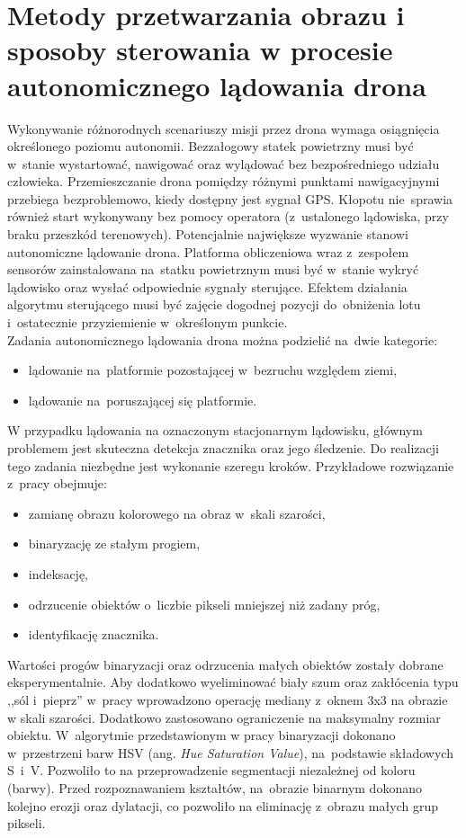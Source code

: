 \chapter{Metody przetwarzania obrazu i sposoby sterowania w procesie autonomicznego lądowania drona}
\label{cha:Metody przetwarzania obrazu i sposoby sterowania w procesie autonomicznego lądowania drona}
Wykonywanie różnorodnych scenariuszy misji przez drona wymaga osiągnięcia określonego poziomu autonomii. Bezzałogowy statek powietrzny musi być w~stanie wystartować, nawigować oraz wylądować bez bezpośredniego udziału człowieka. 
Przemieszczanie drona pomiędzy różnymi punktami nawigacyjnymi przebiega bezproblemowo, kiedy dostępny jest sygnał GPS. 
Kłopotu nie~sprawia również start wykonywany bez pomocy operatora (z~ustalonego lądowiska, przy braku przeszkód terenowych). 
Potencjalnie największe wyzwanie stanowi autonomiczne lądowanie drona. 
Platforma obliczeniowa wraz z~zespołem sensorów zainstalowana na~statku powietrznym musi być w~stanie wykryć lądowisko oraz wysłać odpowiednie sygnały sterujące. 
Efektem działania algorytmu sterującego musi być zajęcie dogodnej pozycji do~obniżenia lotu i~ostatecznie przyziemienie w~określonym punkcie. \\
Zadania autonomicznego lądowania drona można podzielić na~dwie kategorie:  
\begin{itemize}
	\item lądowanie na~platformie pozostającej w~bezruchu względem ziemi,
	\item lądowanie na~poruszającej się platformie.
\end{itemize}

W przypadku lądowania na oznaczonym stacjonarnym lądowisku, głównym problemem jest skuteczna detekcja znacznika oraz jego śledzenie. 
Do realizacji tego zadania niezbędne jest wykonanie szeregu kroków.
Przykładowe rozwiązanie z~pracy \cite{Rings} obejmuje:
\begin{itemize}
	\item zamianę obrazu kolorowego na obraz w~skali szarości,
	\item binaryzację ze stałym progiem,
	\item indeksację,
	\item odrzucenie obiektów o~liczbie pikseli mniejszej niż zadany próg,
	\item identyfikację znacznika.
\end{itemize}

Wartości progów binaryzacji oraz odrzucenia małych obiektów zostały dobrane eksperymentalnie. 
Aby dodatkowo wyeliminować biały szum oraz zakłócenia typu ,,sól i~pieprz'' w~pracy \cite{H_median} wprowadzono operację mediany z~oknem 3x3 na obrazie w skali szarości. 
Dodatkowo zastosowano ograniczenie na maksymalny rozmiar obiektu. 
W~algorytmie przedstawionym w pracy \cite{FPGA} binaryzacji dokonano w~przestrzeni barw HSV (ang. \textit{Hue Saturation Value}), na~podstawie składowych S~i~V. 
Pozwoliło to na przeprowadzenie segmentacji niezależnej od koloru (barwy). 
Przed rozpoznawaniem kształtów, na~obrazie binarnym dokonano kolejno erozji oraz dylatacji, co  pozwoliło na eliminację z~obrazu małych grup pikseli. \par 

